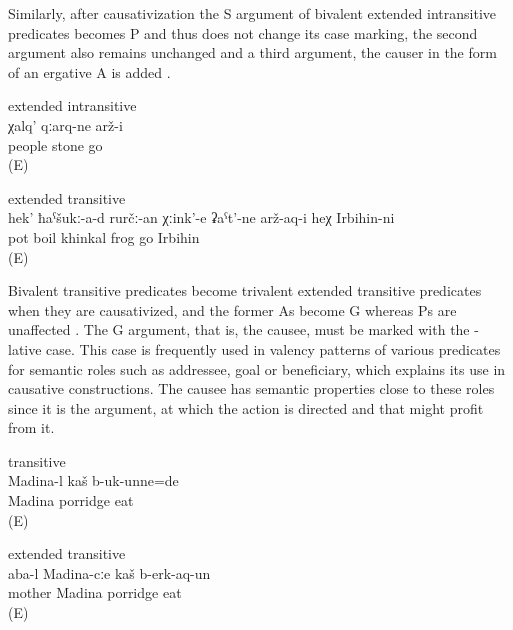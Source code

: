 Similarly, after causativization the S argument of bivalent extended intransitive predicates  becomes P and thus does not change its case marking, the second argument also remains unchanged and a third argument, the causer in the form of an ergative A is added . 
%
\begin{exe}

	\ex	\label{ex:The people turned into stones2} extended intransitive\\
	\gll	χalq'	qːarq-ne	arž-i\\
		people	stone	go\\
	\glt	{} (E)

	\ex	\label{ex:‎‎‎Irbihin turned the khinkal that was boiling in the pot into frogs} extended transitive\\
	\gll	hek'	ħaˁšukː-a-d	rurčː-an	χːink'-e	ʡaˁt'-ne	arž-aq-i	heχ	Irbihin-ni\\
			pot	boil	khinkal\tsc{-pl}	frog	go		Irbihin\\
	\glt	{} (E)
\end{exe}

Bivalent transitive predicates become trivalent extended transitive predicates when they are causativized, and the former As become G whereas Ps are unaffected . The G argument, that is, the causee, must be marked with the -lative case. This case is frequently used in valency patterns of various predicates for semantic roles such as addressee, goal or beneficiary, which explains its use in causative constructions. The causee has semantic properties close to these roles since it is the argument, at which the action is directed and that might profit from it. 
%
\begin{exe}
	\ex	\label{ex:Madina, mother, and the porridge}
	\begin{xlist}
		\ex	\label{ex:Madina was eating porridge} transitive \\
		\gll	Madina-l	kaš	b-uk-unne=de\\
			Madina	porridge	eat\\
		\glt	{} (E)

		\ex	\label{ex:Mother made Madina eat porridge} extended transitive \\
		\gll	aba-l	Madina-cːe	kaš	b-erk-aq-un\\
			mother	Madina	porridge	eat\\
		\glt	{} (E)
	\end{xlist}
\end{exe}




